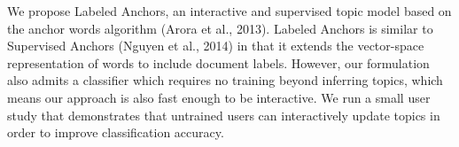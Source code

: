 We propose Labeled Anchors, an interactive and supervised topic model based on the anchor words algorithm (Arora et al., 2013). Labeled Anchors is similar to Supervised Anchors (Nguyen et al., 2014) in that it extends the vector-space representation of words to include document labels. However, our formulation also admits a classifier which requires no training beyond inferring topics, which means our approach is also fast enough to be interactive. We run a small user study that demonstrates that untrained users can interactively update topics in order to improve classification accuracy.
